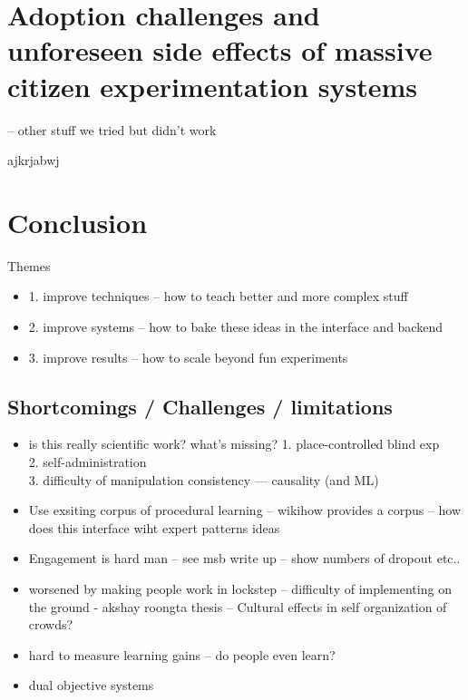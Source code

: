 
\chapter{Adoption challenges and unforeseen side effects of massive citizen experimentation systems}
-- other stuff we tried but didn’t work

ajkrjabwj


\chapter{Conclusion}

Themes
\begin{itemize}
\item 1. improve techniques  -- how to teach better and more complex stuff
\item 2. improve systems -- how to bake these ideas in the interface and backend
\item 3. improve results -- how to scale beyond fun experiments
\end{itemize}

\section{Shortcomings / Challenges / limitations}
\begin{itemize}
\item is this really scientific work? what’s missing?
1. place-controlled blind exp \\
2. self-administration \\
3. difficulty of manipulation consistency 
---  causality (and ML)   
\item Use exsiting corpus of procedural learning -- wikihow provides a corpus -- how does this interface wiht expert patterns ideas
\item Engagement is hard man -- see msb write up -- show numbers of dropout etc..
\item worsened by making people work in lockstep --  difficulty of implementing on the ground - akshay roongta thesis -- Cultural effects in self organization of crowds?
\item hard to measure learning gains -- do people even learn?
\item dual objective systems

\end{itemize}

